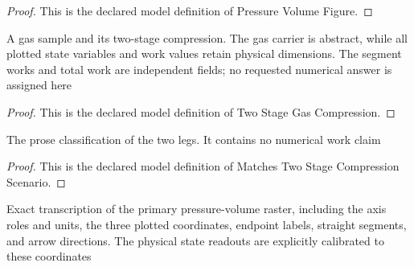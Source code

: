 \begin{proof}
  This is the declared model definition of Pressure Volume Figure.
\end{proof}
\begin{definition}
  \label{def:physics:phyx-mini-0402:phyxminiproblems-problemphyxmini0402-twostagegascompression}
  A gas sample and its two-stage compression. The gas carrier is abstract, while all plotted state variables and work values retain physical dimensions. The segment works and total work are independent fields; no requested numerical answer is assigned here
\end{definition}
\begin{proof}
  This is the declared model definition of Two Stage Gas Compression.
\end{proof}
\begin{definition}
  \label{def:physics:phyx-mini-0402:phyxminiproblems-problemphyxmini0402-matchestwostagecompressionscenario}
  The prose classification of the two legs. It contains no numerical work claim
\end{definition}
\begin{proof}
  This is the declared model definition of Matches Two Stage Compression Scenario.
\end{proof}
\begin{definition}
  \label{def:physics:phyx-mini-0402:phyxminiproblems-problemphyxmini0402-matchesprimarypressurevolumefigure}
  Exact transcription of the primary pressure-volume raster, including the axis roles and units, the three plotted coordinates, endpoint labels, straight segments, and arrow directions. The physical state readouts are explicitly calibrated to these coordinates
\end{definition}
